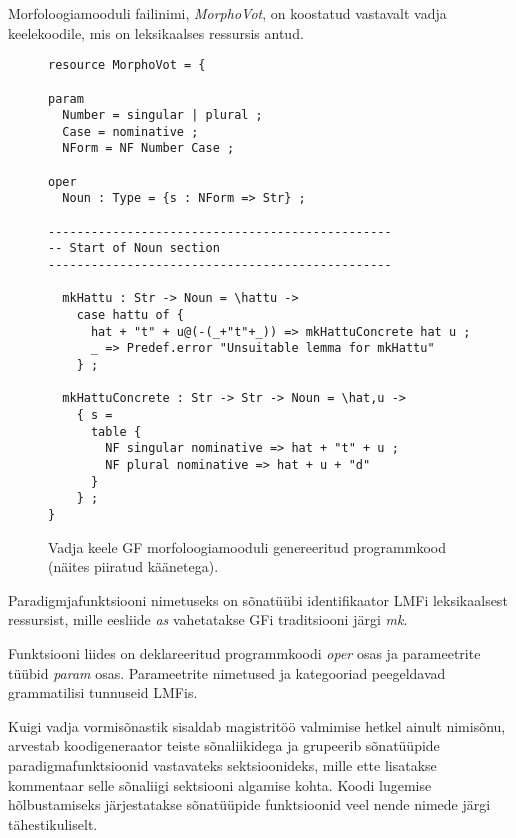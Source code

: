 \documentclass[12pt,a4paper]{article}
\begin{document}
Morfoloogiamooduli failinimi, \textit{MorphoVot}, on koostatud vastavalt vadja keele\-koodile, mis on leksikaalses ressursis antud.

\begin{figure}[ht]
  \center
\begin{verbatim}
resource MorphoVot = {

param
  Number = singular | plural ;
  Case = nominative ;
  NForm = NF Number Case ;

oper
  Noun : Type = {s : NForm => Str} ;

------------------------------------------------
-- Start of Noun section
------------------------------------------------

  mkHattu : Str -> Noun = \hattu -> 
    case hattu of {
      hat + "t" + u@(-(_+"t"+_)) => mkHattuConcrete hat u ;
      _ => Predef.error "Unsuitable lemma for mkHattu"
    } ;
  
  mkHattuConcrete : Str -> Str -> Noun = \hat,u -> 
    { s =
      table {
        NF singular nominative => hat + "t" + u ;
        NF plural nominative => hat + u + "d"
      }
    } ;
}
\end{verbatim}
\caption{Vadja keele GF morfoloogia\-mooduli genereeritud programmkood (näites piiratud käänetega).
  \label{code:gf-morfoloogia}}
\end{figure}

Paradigmjafunktsiooni nimetuseks on sõnatüübi identifikaator LMFi leksikaalsest ressursist, mille eesliide \textit{as} vahetatakse GFi traditsiooni järgi \textit{mk}.

Funktsiooni liides on deklareeritud programmkoodi \textit{oper} osas ja parameetrite tüübid \textit{param} osas. Parameetrite nimetused ja kategooriad peegeldavad grammatilisi tunnuseid LMFis.

Kuigi vadja vormisõnastik sisaldab magistritöö valmimise hetkel ainult nimisõnu, arvestab koodi\-generaator teiste sõna\-liikidega ja grupeerib sõnatüüpide paradigma\-funktsioonid vastavateks sektsioonideks, mille ette lisatakse kommentaar selle sõnaliigi sektsiooni algamise kohta. Koodi lugemise hõlbustamiseks järjestatakse sõnatüüpide funktsioonid veel nende nimede järgi tähestikuliselt. 
\end{document}
